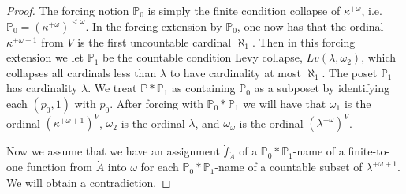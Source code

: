 \documentclass{amsart}
\theoremstyle{plain}
\theoremstyle{definition}
\theoremstyle{remark}
\theoremstyle{plain}
\theoremstyle{definition}
\theoremstyle{remark}
\begin{document}
\begin{proof}
            \bigskip

            The forcing notion $\mathbb P_0$ is simply the finite condition
            collapse of $\kappa^{+\omega}$, i.e. $\mathbb P_0 = \left(
             \kappa^{+\omega}\right)^{<\omega}$. In the forcing extension by
             $\mathbb P_0$, one now has that the ordinal $\kappa^{+\omega+1}$
             from $V$ is the first uncountable cardinal $\aleph_1$. Then in this
             forcing extension we let $\mathbb P_1$ be the countable condition
             Levy collapse, $Lv(\lambda,\omega_2)$, which collapses all cardinals
             less than $\lambda$ to have cardinality at most $\aleph_1$. The poset
             $\mathbb P_1$ has cardinality $\lambda$. We treat
            $\mathbb P*\mathbb P_1$ as containing $\mathbb P_0$
            as a subposet by identifying each $(p_0,1)$ with $p_0$.
            After forcing with $\mathbb P_0*\mathbb P_1$ we will have
            that $\omega_1$ is the ordinal $\left(\kappa^{+\omega+1}\right)^V$,
             $\omega_2$ is the ordinal $\lambda$, and $\omega_\omega$ is the
             ordinal $\left(\lambda^{+\omega}\right)^V$.

            \bigskip

            \newpage

            Now we assume that we have an assignment $\dot f_{\dot A}$ of a
             $\mathbb P_0*\mathbb P_1$-name of a finite-to-one function from
             $\dot A$ into $\omega$ for each
             $\mathbb P_0*\mathbb P_1$-name of a countable subset of
             $\lambda^{+\omega+1}$. We will obtain a contradiction.


\end{proof}
\end{document}
